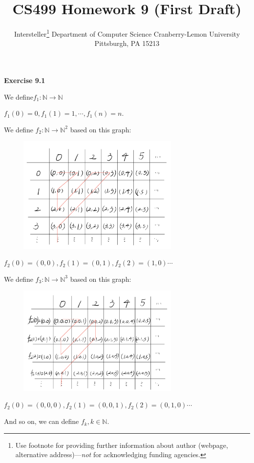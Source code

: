 \documentclass{article} %
\title{CS499 Homework 9 (First Draft)}
\author{
	Intersteller\thanks{ Use footnote for providing further information
		about author (webpage, alternative address)---\emph{not} for acknowledging
		funding agencies.}
	Department of Computer Science
	Cranberry-Lemon University
	Pittsburgh, PA 15213
}
\begin{document}
	
	
	\maketitle
	
	
	\textbf{Exercise 9.1}\par
    We define$f_1:\mathbb{N}\rightarrow \mathbb{N}$\par
    $f_1\left(0\right)=0,
    f_1\left(1\right)=1,
    \cdots,
    f_1\left(n\right)=n.
    $\par
    We define $f_2:\mathbb{N}\rightarrow \mathbb{N}^2$ based on this graph:
    \begin{figure}[H]
  	\centering
  	\includegraphics[width=8cm]{9_1_1.png}
  	\caption{}
  	\label{}
  	\end{figure}
    $f_2\left(0\right)=\left(0,0\right),f_2\left(1\right)=\left(0,1\right),f_2\left(2\right)=\left(1,0\right)\cdots$\par
    We define $f_3:\mathbb{N}\rightarrow \mathbb{N}^3$ based on this graph:
   \begin{figure}[H]
  	\centering
  	\includegraphics[width=8cm]{9_1_2.png}
  	\caption{}
  	\label{}
  	\end{figure}
    $f_2\left(0\right)=\left(0,0,0\right),f_2\left(1\right)=\left(0,0,1\right),f_2\left(2\right)=\left(0,1,0\right)\cdots$\par
    And so on, we can define $f_k,k\in \mathbb{N}$.
\end{document}
